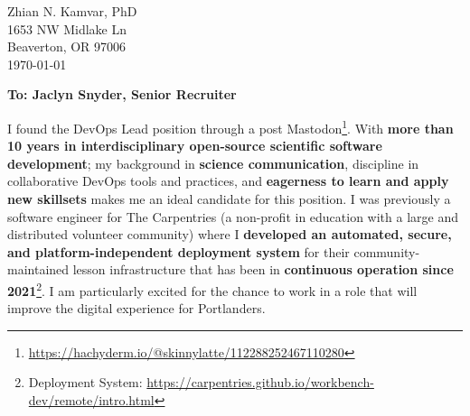 


\clearpage
\begin{flushright}
  Zhian N. Kamvar, PhD\\
  1653 NW Midlake Ln\\
  Beaverton, OR 97006\\
  \today
\end{flushright}

\textbf{To: Jaclyn Snyder, Senior Recruiter}\\

\vspace{2ex}


I found the DevOps Lead position through a post Mastodon\footnote{\url{https://hachyderm.io/@skinnylatte/112288252467110280}}. 
With \textbf{more than 10 years in interdisciplinary open-source scientific software development}; my background in \textbf{science communication}, discipline in collaborative DevOps tools and practices, and \textbf{eagerness to learn and apply new skillsets} makes me an ideal candidate for this position. 
I was previously a software engineer for The Carpentries (a non-profit in education with a large and distributed volunteer community) where I \textbf{developed an automated, secure, and platform-independent deployment system} for their community-maintained lesson infrastructure that has been in \textbf{continuous operation since 2021}\footnote{Deployment System: \url{https://carpentries.github.io/workbench-dev/remote/intro.html}}.
I am particularly excited for the chance to work in a role that will improve the digital experience for Portlanders.



